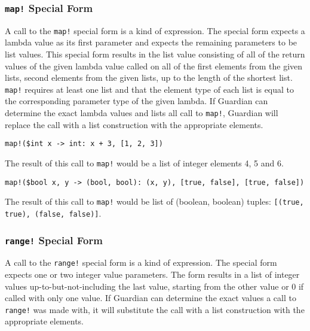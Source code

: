 {	\subsubsection{\lstinline[language=MAIA, columns=fixed]@map!@ Special Form}
	{
		A call to the \lstinline[language=MAIA, columns=fixed]@map!@ special form is a kind of expression.
		The special form expects a lambda value as its
		first parameter and expects the remaining parameters to be list values.
		This special form results in the list value consisting
		of all of the return values of the given lambda value called on all of the
		first elements from the given lists, second elements from the given
		lists, up to the length of the shortest list.
		\lstinline[language=MAIA, columns=fixed]@map!@ requires at least one list and that
		the element type of each list is equal to the corresponding parameter type
		of the given lambda.
		If Guardian can determine the exact lambda values and lists all call to
		\lstinline[language=MAIA, columns=fixed]@map!@, Guardian will replace the call with a list
		construction with the appropriate elements.
		
		\begin{itemize}
		{
			\item[] \lstinline[language=MAIA, columns=fixed]@map!($int x -> int: x + 3, [1, 2, 3])@
			
				The result of this call to \lstinline[language=MAIA, columns=fixed]@map!@ would be a list of
				integer elements 4, 5 and 6.
			
			\item[] \lstinline[language=MAIA, columns=fixed]@map!($bool x, y -> (bool, bool): (x, y), [true, false], [true, false])@
			
				The result of this call to \lstinline[language=MAIA, columns=fixed]@map!@ would be list of
				(boolean, boolean) tuples: \lstinline[language=MAIA, columns=fixed]@[(true, true), (false, false)]@.
		}
		\end{itemize}
	}
	
	\subsubsection{\lstinline[language=MAIA, columns=fixed]@range!@ Special Form}
	{
		A call to the \lstinline[language=MAIA, columns=fixed]@range!@ special form is a kind of expression.
		The special form expects one or two integer value parameters.
		The form results in a list of integer values up-to-but-not-including
		the last value, starting from the other value or 0 if called with only
		one value.
		If Guardian can determine the exact values a call to \lstinline[language=MAIA, columns=fixed]@range!@
		was made with, it will substitute the call with a list construction
		with the appropriate elements.
		
}}
